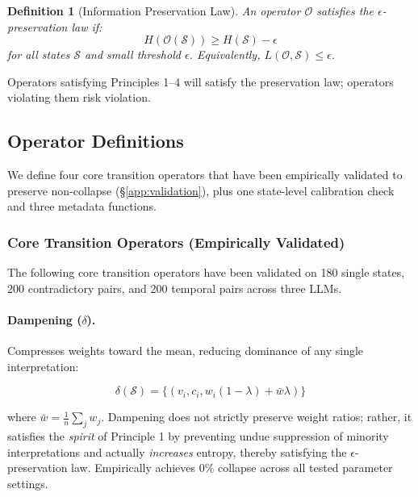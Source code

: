 \documentclass[11pt,a4paper]{article}
\newtheorem{definition}{Definition}
\begin{document}
\begin{definition}[Information Preservation Law]
An operator $\mathcal{O}$ satisfies the $\epsilon$-preservation law if:
\begin{equation}
H(\mathcal{O}(\mathcal{S})) \geq H(\mathcal{S}) - \epsilon
\end{equation}
for all states $\mathcal{S}$ and small threshold $\epsilon$. 
Equivalently, $L(\mathcal{O}, \mathcal{S}) \leq \epsilon$.
\end{definition}

Operators satisfying Principles 1--4 will satisfy the preservation 
law; operators violating them risk violation.

\subsection{Operator Definitions}
\label{app:operator-defs}

We define four core transition operators that have been empirically validated
to preserve non-collapse (§\ref{app:validation}), plus one state-level
calibration check and three metadata functions.

\subsubsection{Core Transition Operators (Empirically Validated)}

The following core transition operators have been validated on 180 single states,
200 contradictory pairs, and 200 temporal pairs across three LLMs.

\paragraph{Dampening ($\delta$).}
Compresses weights toward the mean, reducing dominance of any single 
interpretation:

\begin{equation}
\delta(\mathcal{S}) = \{(v_i, c_i, w_i(1-\lambda) + \bar{w}\lambda)\}
\end{equation}

where $\bar{w} = \frac{1}{n}\sum_j w_j$. Dampening does not strictly 
preserve weight ratios; rather, it satisfies the \textit{spirit} of 
Principle 1 by preventing undue suppression of minority interpretations 
and actually \textit{increases} entropy, thereby satisfying the 
$\epsilon$-preservation law. Empirically achieves 0\% collapse across 
all tested parameter settings.
\end{document}
